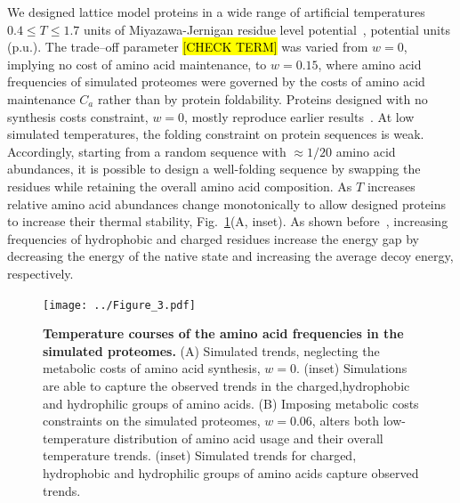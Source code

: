 \documentclass[10pt,letterpaper]{article}
\begin{document}
We designed lattice model proteins in a wide range of artificial temperatures $0.4\leq T\leq 1.7$ units of Miyazawa-Jernigan residue level potential~\cite{Miyazawa1999SelfConsistent}, potential units (p.u.). The trade--off parameter \hl{[CHECK TERM]} was varied from  $\mathit{w}=0$, implying no cost of amino acid maintenance, to $\mathit{w}=0.15$, where amino acid frequencies of simulated proteomes were governed by the costs of amino acid maintenance $C_{a}$ rather than by protein foldability. Proteins designed with no synthesis costs constraint, $\mathit{w}=0$, mostly reproduce earlier results~\cite{Berezovsky2007Positive}.
At low simulated temperatures, the folding constraint on protein sequences is weak. Accordingly, starting from a random sequence with $\approx 1/20$ amino acid abundances, it is possible to design a well-folding sequence by swapping the residues while retaining the overall amino acid composition.  As $T$ increases relative amino acid abundances change monotonically to allow designed proteins to increase their thermal stability, Fig.~\ref{fig:fig3}(A, inset). As shown before~\cite{Berezovsky2007Positive}, increasing frequencies of hydrophobic and charged residues increase the energy gap by decreasing the energy of the native state and increasing the average decoy energy, respectively. 



\begin{figure}[h!]
\texttt{[image: ../Figure\_3.pdf]}
\caption{
{\bf Temperature courses of the amino acid frequencies in the simulated proteomes.} (A) Simulated trends, neglecting the metabolic costs of amino acid synthesis, $\mathit{w}=0$. (inset) Simulations are able to capture the observed trends in the charged,hydrophobic and hydrophilic groups of amino acids. (B) Imposing metabolic costs constraints on the simulated proteomes, $\mathit{w}=0.06$, alters both low-temperature distribution of amino acid usage and their overall temperature trends. (inset) Simulated trends for charged, hydrophobic and hydrophilic groups of amino acids capture observed trends.
}
\label{fig:fig3}
\end{figure}
\end{document}
